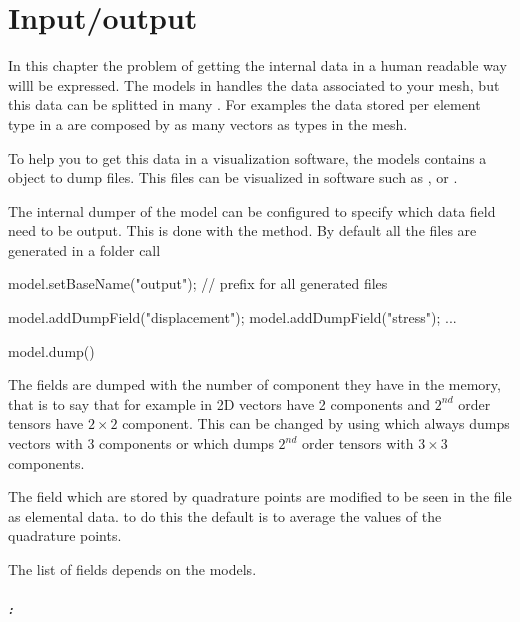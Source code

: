 \chapter{Input/output}

In this chapter the problem of getting the internal data in a human readable way
willl be expressed. The models in \akantu handles the data associated to your
mesh, but this data can be splitted in many . For examples the
data stored per element type in a  are composed by as
many vectors as types in the mesh.

To help you to get this data in a visualization software, the models contains a
object to dump  files. This files can be visualized in software such
as ,  or .

The internal dumper of the model can be configured to specify which data field
need to be output. This is done with the
 method. By default all the files are
generated in a folder call 

\begin{cpp}
  model.setBaseName("output"); // prefix for all generated files

  model.addDumpField("displacement");
  model.addDumpField("stress");
  ...

  model.dump()
\end{cpp}

The fields are dumped with the number of component they have in the memory, that
is to say that for example in 2D vectors have 2 components and $2^{nd}$ order
tensors have $2\times2$ component.  This can be changed by using
 which always dumps
vectors with 3 components or
 which dumps $2^{nd}$
order tensors with $3\times3$ components.

The field which are stored by quadrature points are modified to be seen in the
 file as elemental data. to do this the default is to average the
values of the quadrature points.

The list of fields depends on the models.

\paragraph{:}\hfill
\vspace*{0.2cm}

